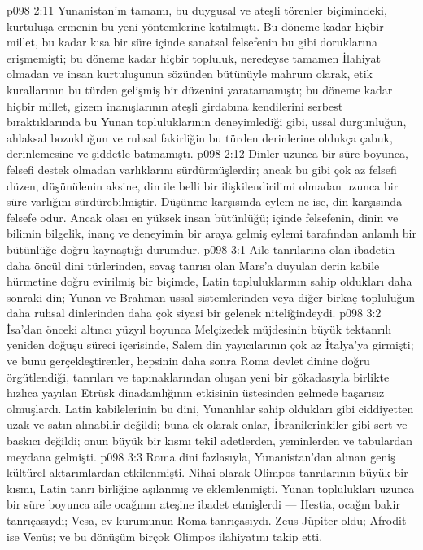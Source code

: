 \vs p098 2:11 Yunanistan’ın tamamı, bu duygusal ve ateşli törenler biçimindeki, kurtuluşa ermenin bu yeni yöntemlerine katılmıştı. Bu döneme kadar hiçbir millet, bu kadar kısa bir süre içinde sanatsal felsefenin bu gibi doruklarına erişmemişti; bu döneme kadar hiçbir topluluk, neredeyse tamamen İlahiyat olmadan ve insan kurtuluşunun sözünden bütünüyle mahrum olarak, etik kurallarının bu türden gelişmiş bir düzenini yaratamamıştı; bu döneme kadar hiçbir millet, gizem inanışlarının ateşli girdabına kendilerini serbest bıraktıklarında bu Yunan topluluklarının deneyimlediği gibi, ussal durgunluğun, ahlaksal bozukluğun ve ruhsal fakirliğin bu türden derinlerine oldukça çabuk, derinlemesine ve şiddetle batmamıştı.
\vs p098 2:12 Dinler uzunca bir süre boyunca, felsefi destek olmadan varlıklarını sürdürmüşlerdir; ancak bu gibi çok az felsefi düzen, düşünülenin aksine, din ile belli bir ilişkilendirilimi olmadan uzunca bir süre varlığını sürdürebilmiştir. Düşünme karşısında eylem ne ise, din karşısında felsefe odur. Ancak olası en yüksek insan bütünlüğü; içinde felsefenin, dinin ve bilimin bilgelik, inanç ve deneyimin bir araya gelmiş eylemi tarafından anlamlı bir bütünlüğe doğru kaynaştığı durumdur.
\vs p098 3:1 Aile tanrılarına olan ibadetin daha öncül dini türlerinden, savaş tanrısı olan Mars’a duyulan derin kabile hürmetine doğru evirilmiş bir biçimde, Latin topluluklarının sahip oldukları daha sonraki din; Yunan ve Brahman ussal sistemlerinden veya diğer birkaç topluluğun daha ruhsal dinlerinden daha çok siyasi bir gelenek niteliğindeydi.
\vs p098 3:2 İsa’dan önceki altıncı yüzyıl boyunca Melçizedek müjdesinin büyük tektanrılı yeniden doğuşu süreci içerisinde, Salem din yayıcılarının çok az İtalya’ya girmişti; ve bunu gerçekleştirenler, hepsinin daha sonra Roma devlet dinine doğru örgütlendiği, tanrıları ve tapınaklarından oluşan yeni bir gökadasıyla birlikte hızlıca yayılan Etrüsk dinadamlığının etkisinin üstesinden gelmede başarısız olmuşlardı. Latin kabilelerinin bu dini, Yunanlılar sahip oldukları gibi ciddiyetten uzak ve satın alınabilir değildi; buna ek olarak onlar, İbranilerinkiler gibi sert ve baskıcı değildi; onun büyük bir kısmı tekil adetlerden, yeminlerden ve tabulardan meydana gelmişti.
\vs p098 3:3 Roma dini fazlasıyla, Yunanistan’dan alınan geniş kültürel aktarımlardan etkilenmişti. Nihai olarak Olimpos tanrılarının büyük bir kısmı, Latin tanrı birliğine aşılanmış ve eklemlenmişti. Yunan toplulukları uzunca bir süre boyunca aile ocağının ateşine ibadet etmişlerdi --- Hestia, ocağın bakir tanrıçasıydı; Vesa, ev kurumunun Roma tanrıçasıydı. Zeus Jüpiter oldu; Afrodit ise Venüs; ve bu dönüşüm birçok Olimpos ilahiyatını takip etti.

